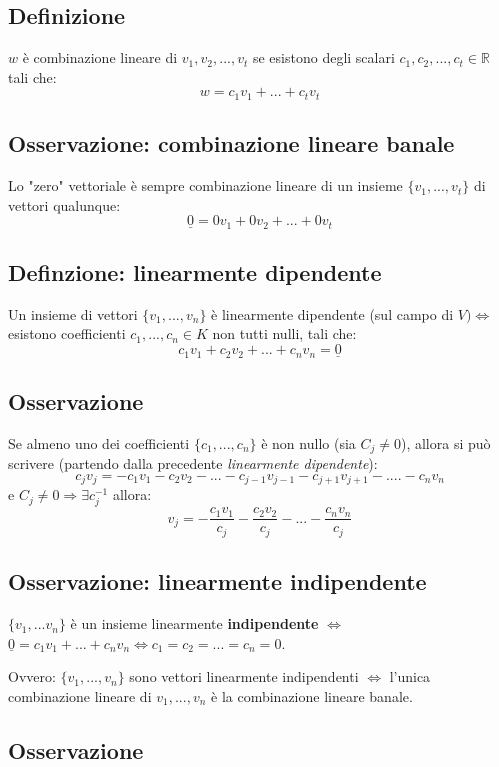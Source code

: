 \subsection{Definizione}

\(w\) è combinazione lineare di \(v_1,v_2,...,v_t\) se esistono degli scalari \(c_1,c_2,...,c_t\in\mathbb{R}\) tali che:
\[w=c_1v_1+...+c_tv_t\]

\subsection{Osservazione: combinazione lineare banale}
Lo "zero" vettoriale è sempre combinazione lineare di un insieme \(\{v_1,...,v_t\}\) di vettori qualunque:
\[\underline{0}=0v_1+0v_2+...+0v_t\]

\subsection{Definzione: linearmente dipendente}
Un insieme di vettori \(\{v_1,...,v_n\}\) è linearmente dipendente (sul campo di \(V)\Leftrightarrow\) esistono coefficienti \(c_1,...,c_n\in K\) non tutti nulli, tali che:
\[c_1v_1+c_2v_2+...+c_nv_n=\underline{0}\]

\subsection{Osservazione}
Se almeno uno dei coefficienti \(\{c_1,...,c_n\}\) è non nullo (sia \(C_j\neq 0\)), allora si può scrivere (partendo dalla precedente \textit{linearmente dipendente}):
\[c_jv_j=-c_1v_1-c_2v_2-...-c_{j-1}v_{j-1}-c_{j+1}v_{j+1}-....-c_nv_n\]
e \(C_j\neq 0\Rightarrow \exists c_j^{-1}\) allora:
\[v_j=-\frac{c_1v_1}{c_j}-\frac{c_2v_2}{c_j}-...-\frac{c_nv_n}{c_j}\]

\subsection{Osservazione: linearmente indipendente}
\(\{v_1,...v_n\}\) è un insieme linearmente \textbf{indipendente} \(\Leftrightarrow\) \(\underline{0}=c_1v_1+...+c_nv_n\Leftrightarrow c_1=c_2=...=c_n=0\).

Ovvero: \(\{v_1,...,v_n\}\) sono vettori linearmente indipendenti \(\Leftrightarrow\) l'unica combinazione lineare di \(v_1,...,v_n\) è la combinazione lineare banale.

\subsection{Osservazione}

